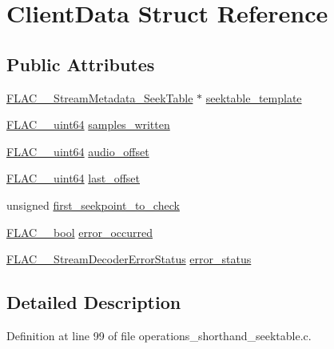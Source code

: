 \hypertarget{struct_client_data}{}\section{Client\+Data Struct Reference}
\label{struct_client_data}
\subsection*{Public Attributes}
\begin{DoxyCompactItemize}
\item 
\hyperlink{struct_f_l_a_c_____stream_metadata___seek_table}{F\+L\+A\+C\+\_\+\+\_\+\+Stream\+Metadata\+\_\+\+Seek\+Table} $\ast$ \hyperlink{struct_client_data_a93a69c5edfdd7662e6f43e4e2b4b0e1e}{seektable\+\_\+template}
\item 
\hyperlink{ordinals_8h_aa78c8c70a3eb8a58af7436f278acde8e}{F\+L\+A\+C\+\_\+\+\_\+uint64} \hyperlink{struct_client_data_ae810896908bfc68291ceb7de7cbe6bd8}{samples\+\_\+written}
\item 
\hyperlink{ordinals_8h_aa78c8c70a3eb8a58af7436f278acde8e}{F\+L\+A\+C\+\_\+\+\_\+uint64} \hyperlink{struct_client_data_ac451421a53f048c1de1f8779747bc6bd}{audio\+\_\+offset}
\item 
\hyperlink{ordinals_8h_aa78c8c70a3eb8a58af7436f278acde8e}{F\+L\+A\+C\+\_\+\+\_\+uint64} \hyperlink{struct_client_data_ad925313e711da4224871670a62be0446}{last\+\_\+offset}
\item 
unsigned \hyperlink{struct_client_data_a411472e0a029ebd8fdac443cdbfc266f}{first\+\_\+seekpoint\+\_\+to\+\_\+check}
\item 
\hyperlink{ordinals_8h_a95103469f1cbd78b8cf250194985b34e}{F\+L\+A\+C\+\_\+\+\_\+bool} \hyperlink{struct_client_data_a49bb3cfefdccec2c7212ad4d378bbe4f}{error\+\_\+occurred}
\item 
\hyperlink{group__flac__stream__decoder_ga130e70bd9a73d3c2416247a3e5132ecf}{F\+L\+A\+C\+\_\+\+\_\+\+Stream\+Decoder\+Error\+Status} \hyperlink{struct_client_data_a10b0781f69413999ab5af69f88927205}{error\+\_\+status}
\end{DoxyCompactItemize}


\subsection{Detailed Description}


Definition at line 99 of file operations\+\_\+shorthand\+\_\+seektable.\+c.



